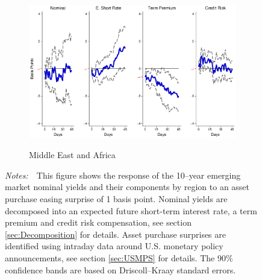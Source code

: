 \documentclass[a4paper, 12pt]{article}
\newcommand{\figtext}[1]{
	\vspace{-1ex}
	\captionsetup{justification=justified,font=footnotesize}
	\caption*{#1}
}
\newcommand{\fignotes}[1]{\figtext{\emph{Notes:~}~#1}}
\begin{document}
\begin{appendices}
\begin{landscape}
\begin{figure}[tbph]
\begin{center}
\begin{minipage}{\linewidth}
\begin{center}
						\begin{subfigure}[t]{\linewidth}
							\includegraphics[trim={0cm 0cm 0cm 0cm},clip,height=0.35\textheight,width=\linewidth]{../Figures/LSAPMAnomyptpphi120m.eps} \\
							\vspace{-0.35cm}
							\caption{Middle East and Africa} \label{subfig:LPMA10Ylsap}
						\end{subfigure}
						\vspace{-0.45cm}
					\end{center}
					\fignotes{This figure shows the response of the 10--year emerging market nominal yields and their components by region to an asset purchase easing surprise of 1 basis point. Nominal yields are decomposed into an expected future short-term interest rate, a term premium and credit risk compensation, see section \ref{sec:Decomposition} for details. Asset purchase surprises are identified using intraday data around U.S. monetary policy announcements, see section \ref{sec:USMPS} for details. The 90\% confidence bands are based on Driscoll--Kraay standard errors.}
				\end{minipage}
			\end{center}
		\end{figure}
		

\end{landscape}
\end{appendices}
\end{document}
